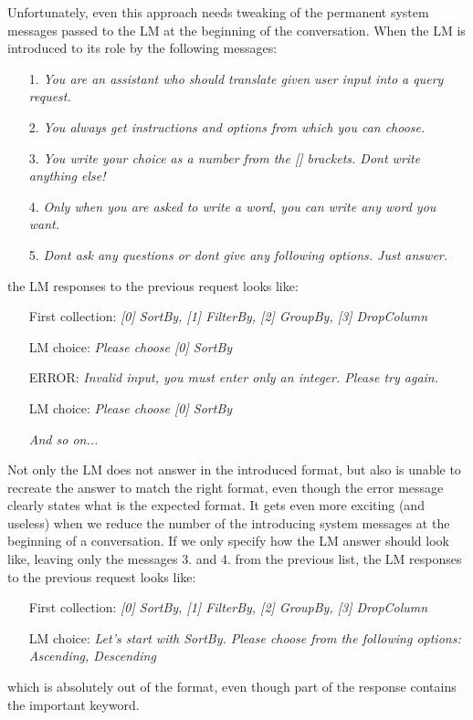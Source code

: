\documentclass[12pt]{article}
\begin{document}
Unfortunately, even this approach needs tweaking of the permanent system messages passed to the LM at the beginning of the conversation. When the LM is introduced to its role by the following messages:
\begin{enumerate}
    \item[1.] \textit{You are an assistant who should translate given user input into a query request.}
    \item[2.] \textit{You always get instructions and options from which you can choose.}
    \item[3.] \textit{You write your choice as a number from the [] brackets. Dont write anything else!} 
    \item[4.] \textit{Only when you are asked to write a word, you can write any word you want.}
    \item[5.] \textit{Dont ask any questions or dont give any following options. Just answer.} 
\end{enumerate} the LM responses to the previous request looks like:
\begin{enumerate}
    \item[First collection:]\textit{[0] SortBy, [1] FilterBy, [2] GroupBy, [3] DropColumn}
    \item[LM choice:]\textit{Please choose [0] SortBy}
    \item[ERROR:]\textit{Invalid input, you must enter only an integer. Please try again.}
    \item[LM choice:]\textit{Please choose [0] SortBy}
    \item[] \textit{And so on...}  
\end{enumerate}

Not only the LM does not answer in the introduced format, but also is unable to recreate the answer to match the right format, even though the error message clearly states what is the expected format. It gets even more exciting (and useless) when we reduce the number of the introducing system messages at the beginning of a conversation. If we only specify how the LM answer should look like, leaving only the messages 3. and 4. from the previous list, the LM responses to the previous request looks like:

\begin{enumerate}
    \item[First collection:]\textit{[0] SortBy, [1] FilterBy, [2] GroupBy, [3] DropColumn}
    \item[LM choice:]\textit{Let's start with SortBy. Please choose from the following options: 
    \newline
    [0] Ascending,
    \newline
    [1] Descending}
\end{enumerate}
which is absolutely out of the format, even though part of the response contains the important keyword.
\end{document}
